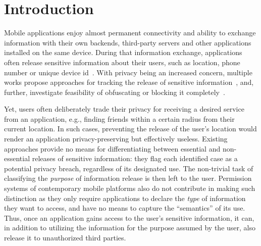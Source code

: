 \section{Introduction}
\label{sec:intro} 
Mobile applications enjoy almost permanent connectivity and ability to exchange information with their own backends, third-party servers and other applications installed on the same device. 
During that information exchange, applications often release sensitive information about their users, such as location, phone number or unique device id~\cite{Enck:Gilbert:Chun:Cox:Jung:McDaniel:Sheth:OSDI10, Egele:Kruegel:Kirda:Vign:NDSS11,Tripp:Rubin:SEC14}. 
With privacy being an increased concern, multiple works propose approaches for tracking the release of 
sensitive information~\cite{Enck:Gilbert:Chun:Cox:Jung:McDaniel:Sheth:OSDI10,Egele:Kruegel:Kirda:Vign:NDSS11,Arzt:Rasthofer:Fritz:Bodden:Bartel:Klein:Traon:Octeau:McDaniel:PLDI14, Tripp:Rubin:SEC14,Gordon:Kim:Perkins:Gilham:Nguyen:Rinard:NDSS15}, and, further, investigate
feasibility of obfuscating or blocking it completely~\cite{Hornyack:Han:Jung:Schechter:Wetherall:CCS11}.

Yet, users often deliberately trade their privacy for receiving a desired service from an application, 
e.g., finding friends within a certain radius from their current location. 
In such cases, preventing the release of the user's location would render an application privacy-preserving but effectively useless. 
Existing approaches provide no means for differentiating between essential and non-essential releases of sensitive information: they flag each identified case as a potential privacy breach, regardless of its designated use. 
The non-trivial task of classifying the \emph{purpose} of information release is then left to the user. 
Permission systems of contemporary mobile platforms also do not contribute in making such distinction as they only require applications to declare the \emph{type} of information they want to access, and have no means to capture the ``semantics'' of its use. 
Thus, once an application gains access to the user's sensitive information, it can, in addition to utilizing the information for the purpose assumed by the user, also release it to unauthorized third parties.

